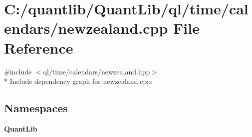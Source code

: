 \section{C\+:/quantlib/\+Quant\+Lib/ql/time/calendars/newzealand.cpp File Reference}
\label{newzealand_8cpp}
{\ttfamily \#include $<$ql/time/calendars/newzealand.\+hpp$>$}\\*
Include dependency graph for newzealand.\+cpp\+:
\subsection*{Namespaces}
\begin{DoxyCompactItemize}
\item 
 {\bf Quant\+Lib}
\end{DoxyCompactItemize}
